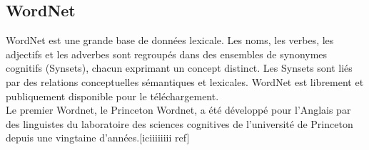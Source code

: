 
    \subsection{WordNet}
    WordNet est une grande base de données lexicale. Les noms, les verbes, les adjectifs et les adverbes sont regroupés dans des ensembles de synonymes cognitifs (Synsets), chacun exprimant un concept distinct. Les Synsets sont liés par des relations conceptuelles sémantiques et lexicales. WordNet est librement et publiquement disponible pour le téléchargement.\\
    Le premier Wordnet, le Princeton Wordnet, a été développé pour l'Anglais par des linguistes du laboratoire des sciences cognitives de l'université de Princeton depuis une vingtaine d'années.[iciiiiiiii ref]
